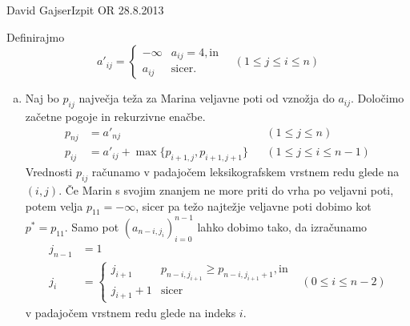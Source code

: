 \begin{naloga}{David Gajser}{Izpit OR 28.8.2013}
\begin{odgovor}
Definirajmo
$$
a'_{ij} = \begin{cases}
-\infty & a_{ij} = 4, \text{in} \\
a_{ij} & \text{sicer} .
\end{cases} \quad (1 \le j \le i \le n)
$$
\begin{enumerate}[(a)]
\item Naj bo $p_{ij}$ največja teža za Marina veljavne poti
od vznožja do $a_{ij}$.
Določimo začetne pogoje in rekurzivne enačbe.
\begin{align*}
p_{nj} &= a'_{nj} && (1 \le j \le n) \\
p_{ij} &= a'_{ij} + \max\{p_{i+1,j}, p_{i+1,j+1}\} && (1 \le j \le i \le n-1)
\end{align*}
Vrednosti $p_{ij}$ računamo
v padajočem leksikografskem vrstnem redu glede na $(i, j)$.
Če Marin s svojim znanjem ne more priti do vrha po veljavni poti,
potem velja $p_{11} = -\infty$,
sicer pa težo najtežje veljavne poti dobimo kot $p^* = p_{11}$.
Samo pot $(a_{n-i, j_i})_{i=0}^{n-1}$ lahko dobimo tako,
da izračunamo
\begin{align*}
j_{n-1} &= 1 \\
j_i &= \begin{cases}
j_{i+1} & p_{n-i,j_{i+1}} \ge p_{n-i,j_{i+1}+1}, \text{in} \\
j_{i+1} + 1 & \text{sicer}
\end{cases}
& (0 \le i \le n-2)
\end{align*}
v padajočem vrstnem redu glede na indeks $i$.


\end{enumerate}
\end{odgovor}
\end{naloga}
